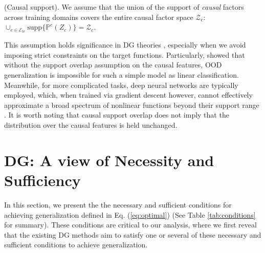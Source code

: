 \begin{assumption} (Causal support). We assume that the union of the support of \textit{causal} factors across training domains covers the entire causal factor space $\mathcal{Z}_c$: $\cup_{e\in \mathcal{E}_{tr}}\text{supp}\{\mathbb{P}^{e} \left (Z_c \right )\}=\mathcal{Z}_c$. 
\label{as:sufficient_causal_support}
\end{assumption}


This assumption holds significance in DG theories \citep{johansson2019support, ruan2021optimal, li2022sparse}, especially when we avoid imposing strict constraints on the target functions. Particularly, \citep{ahuja2021invariance} showed that without the support overlap assumption on the causal features, OOD generalization is impossible for such a simple model as linear classification. Meanwhile, for more complicated tasks, deep neural networks are typically employed, which, when trained via gradient descent however, cannot effectively approximate a broad spectrum of nonlinear functions beyond their support range \citep{xu2020neural}. It is worth noting that causal support overlap does not imply that the distribution over the causal features is held unchanged.






\section{DG: A view of Necessity and
Sufficiency}\label{sec:main_conds}

In this section, we present the the necessary and sufficient conditions for achieving generalization defined in Eq. (\ref{eq:optimal}) (See Table \ref{tab:conditions} for summary). These conditions are critical to our analysis, where we first reveal that the existing DG methods aim to satisfy one or several of these necessary and sufficient conditions to achieve generalization. %


